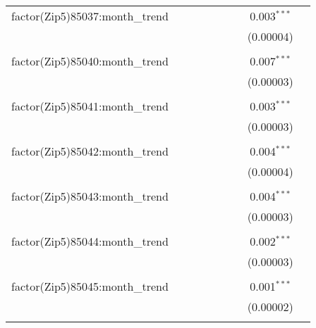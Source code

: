 \begin{table}[H]
{\begin{tabular}{@{\extracolsep{5pt}}lcccccccc}
  factor(Zip5)85037:month\_trend &  &  &  &  &  &  & 0.003$^{***}$ &  \\  

   &  &  &  &  &  &  & (0.00004) &  \\  

   & & & & & & & & \\  

  factor(Zip5)85040:month\_trend &  &  &  &  &  &  & 0.007$^{***}$ &  \\  

   &  &  &  &  &  &  & (0.00003) &  \\  

   & & & & & & & & \\  

  factor(Zip5)85041:month\_trend &  &  &  &  &  &  & 0.003$^{***}$ &  \\  

   &  &  &  &  &  &  & (0.00003) &  \\  

   & & & & & & & & \\  

  factor(Zip5)85042:month\_trend &  &  &  &  &  &  & 0.004$^{***}$ &  \\  

   &  &  &  &  &  &  & (0.00004) &  \\  

   & & & & & & & & \\  

  factor(Zip5)85043:month\_trend &  &  &  &  &  &  & 0.004$^{***}$ &  \\  

   &  &  &  &  &  &  & (0.00003) &  \\  

   & & & & & & & & \\  

  factor(Zip5)85044:month\_trend &  &  &  &  &  &  & 0.002$^{***}$ &  \\  

   &  &  &  &  &  &  & (0.00003) &  \\  

   & & & & & & & & \\  

  factor(Zip5)85045:month\_trend &  &  &  &  &  &  & 0.001$^{***}$ &  \\  

   &  &  &  &  &  &  & (0.00002) &  \\  

   & & & & & & & & \\  


\end{tabular}}
\end{table}
